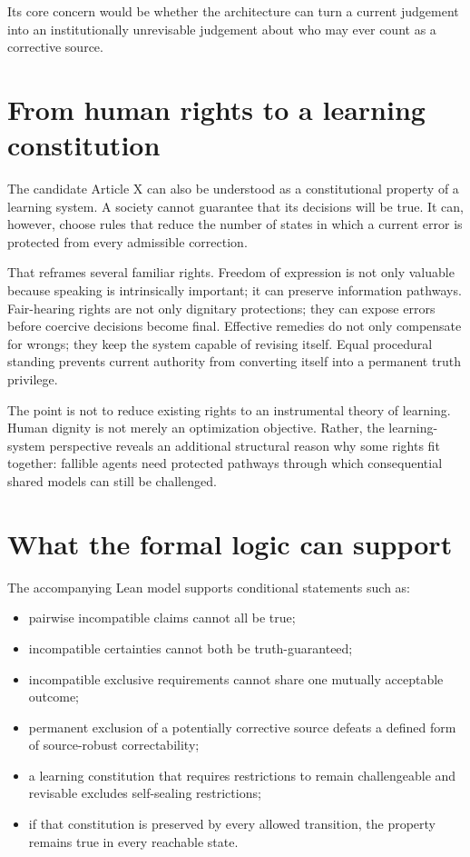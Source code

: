 \documentclass[11pt,a4paper]{article}
\begin{document}
Its core concern would be whether the architecture can turn a current judgement into an institutionally unrevisable judgement about who may ever count as a corrective source.

\section{From human rights to a learning constitution}

The candidate Article X can also be understood as a constitutional property of a learning system. A society cannot guarantee that its decisions will be true. It can, however, choose rules that reduce the number of states in which a current error is protected from every admissible correction.

That reframes several familiar rights. Freedom of expression is not only valuable because speaking is intrinsically important; it can preserve information pathways. Fair-hearing rights are not only dignitary protections; they can expose errors before coercive decisions become final. Effective remedies do not only compensate for wrongs; they keep the system capable of revising itself. Equal procedural standing prevents current authority from converting itself into a permanent truth privilege.

The point is not to reduce existing rights to an instrumental theory of learning. Human dignity is not merely an optimization objective. Rather, the learning-system perspective reveals an additional structural reason why some rights fit together: fallible agents need protected pathways through which consequential shared models can still be challenged.

\section{What the formal logic can support}

The accompanying Lean model supports conditional statements such as:
\begin{itemize}
  \item pairwise incompatible claims cannot all be true;
  \item incompatible certainties cannot both be truth-guaranteed;
  \item incompatible exclusive requirements cannot share one mutually acceptable outcome;
  \item permanent exclusion of a potentially corrective source defeats a defined form of source-robust correctability;
  \item a learning constitution that requires restrictions to remain challengeable and revisable excludes self-sealing restrictions;
  \item if that constitution is preserved by every allowed transition, the property remains true in every reachable state.
\end{itemize}
\end{document}
